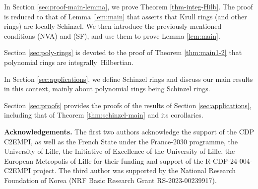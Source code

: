 \documentclass[11pt,a4paper,reqno]{amsart}
\theoremstyle{definition}
\begin{document}
In Section \ref{sec:proof-main-lemma}, we prove Theorem \ref{thm-integ-Hilb}. The proof is reduced to that of Lemma \ref{lem:main} that asserts that Krull rings (and other rings) are locally Schinzel. We then introduce the previously mentioned conditions (NVA) and (SF), and use them to prove Lemma \ref{lem:main}.
\vskip 1mm

Section \ref{sec:poly-rings} is devoted to the proof of Theorem \ref{thm:main1-2} that polynomial rings are \hbox{integrally Hilbertian.}
\vskip 1mm


In Section \ref{sec:applications}, we define Schinzel rings and discuss our main results in this context, mainly about polynomial rings being Schinzel rings.
\vskip 1mm


Section \ref{sec:proofs} provides the proofs of the results of Section \ref{sec:applications}, including that of Theorem \ref{thm:schinzel-main} and its corollaries.


\vskip 2mm


\noindent
{\bf Acknowledgements.} The first two authors acknowledge the support of the CDP C2EMPI, as well as the French State under the France-2030 programme, the University of Lille, the Initiative of Excellence of the University of Lille, the European Metropolis of Lille for their funding and support of the R-CDP-24-004-C2EMPI project. The third author was supported by the National Research Foundation of Korea (NRF Basic Research Grant RS-2023-00239917).
\end{document}
